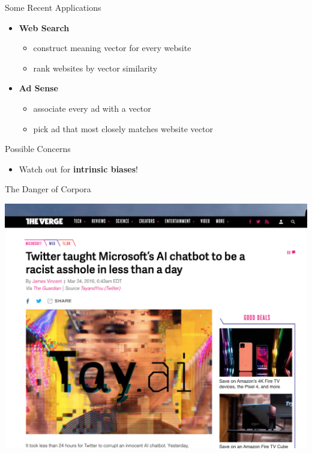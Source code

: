 \documentclass[professionalfonts, xcolor={usenames,svgnames,x11names,table}]{beamer}
\begin{document}
\begin{frame}{Some Recent Applications}
    \begin{itemize}
        \item \textbf{Web Search}
            \begin{itemize}
                \item construct meaning vector for every website
                \item rank websites by vector similarity
            \end{itemize}
        \item \textbf{Ad Sense}
            \begin{itemize}
                \item associate every ad with a vector
                \item pick ad that most closely matches website vector
            \end{itemize}
    \end{itemize}

    \begin{block}{Possible Concerns}
 \begin{itemize}
                    \item Watch out for \alert{\textbf{intrinsic biases}!}
            \end{itemize}
    \end{block}
\end{frame}

\begin{frame}{The Danger of Corpora}

\begin{center}
        \includegraphics[width=1\linewidth]{./img/bias1}
\end{center}

\end{frame}
\end{document}
